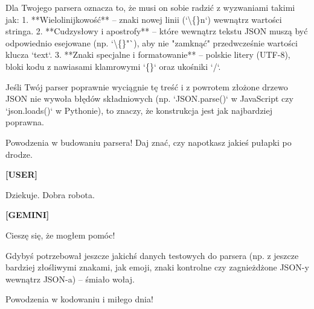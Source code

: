 \documentclass[10pt,a4paper]{article}
\newcommand{\UserTurn}{\textbf{[USER]}\par\medskip}
\newcommand{\ModelTurn}{\textbf{[GEMINI]}\par\medskip}
\newcommand{\Separator}{\par\vspace{4pt}\noindent{\color{rulecolor}\rule{\linewidth}{0.4pt}}\par\vspace{6pt}}
\begin{document}
Dla Twojego parsera oznacza to, że musi on sobie radzić z wyzwaniami takimi jak:
1. **Wielolinijkowość** – znaki nowej linii (`\textbackslash\{\}n`) wewnątrz wartości stringa.
2. **Cudzysłowy i apostrofy** – które wewnątrz tekstu JSON muszą być odpowiednio esejowane (np. `\textbackslash\{\}"`), aby nie "zamknąć" przedwcześnie wartości klucza `text`.
3. **Znaki specjalne i formatowanie** – polskie litery (UTF-8), bloki kodu z nawiasami klamrowymi `\{\}` oraz ukośniki `/`.

Jeśli Twój parser poprawnie wyciągnie tę treść i z powrotem złożone drzewo JSON nie wywoła błędów składniowych (np. `JSON.parse()` w JavaScript czy `json.loads()` w Pythonie), to znaczy, że konstrukcja jest jak najbardziej poprawna.

Powodzenia w budowaniu parsera! Daj znać, czy napotkasz jakieś pułapki po drodze.
\Separator
\UserTurn
Dziekuje. Dobra robota.
\Separator
\ModelTurn
Cieszę się, że mogłem pomóc! 

Gdybyś potrzebował jeszcze jakichś danych testowych do parsera (np. z jeszcze bardziej złośliwymi znakami, jak emoji, znaki kontrolne czy zagnieżdżone JSON-y wewnątrz JSON-a) – śmiało wołaj. 

Powodzenia w kodowaniu i miłego dnia!
\Separator
\end{document}

